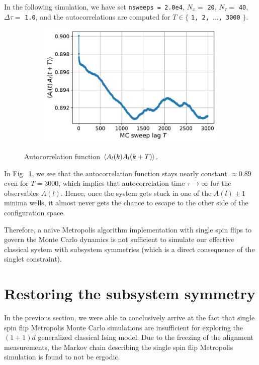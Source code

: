 \documentclass[../thesis_main.tex]{subfiles}
\begin{document}
In the following simulation, we have set \texttt{nsweeps = 2.0e4}, $N_x = $ \texttt{20}, $N_\tau = $ \texttt{40}, $\Delta \tau = $ \texttt{1.0}, and the autocorrelations are computed for $T \in \{ $ \texttt{1, 2, $\ldots$, 3000} $\}$.     
\begin{figure}[!htb]
    \centering
    \begin{subfigure}[b]{0.5\textwidth}
        \centering
        \includegraphics[width=\textwidth]{images/misc/autocorrfn_singlet.pdf}
    \end{subfigure}
    \caption{Autocorrelation function $\expval{A_l(k) A_l(k+T)}$.}
    \label{autocorrs_singlet}
\end{figure}
\FloatBarrier
In Fig.~\ref{autocorrs_singlet}, we see that the autocorrelation function stays nearly constant $\approx 0.89$ even for $T = 3000$, which implies that autocorrelation time $\tau \to \infty$ for the observables $A(l)$. Hence, once the system gets stuck in one of the $A(l) \pm 1$ minima wells, it almost never gets the chance to escape to the other side of the configuration space. 

Therefore, a naive Metropolis algorithm implementation with single spin flips to govern the Monte Carlo dynamics is not sufficient to simulate our effective classical system with subsystem symmetries (which is a direct consequence of the singlet constraint).

\section{Restoring the subsystem symmetry}
In the previous section, we were able to conclusively arrive at the fact that single spin flip Metropolis Monte Carlo simulations are insufficient for exploring the $(1+1)d$ generalized classical Ising model. Due to the freezing of the alignment measurements, the Markov chain describing the single spin flip Metropolis simulation is found to not be ergodic. 
\end{document}

